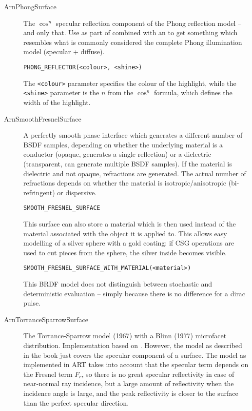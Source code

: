 \begin{description}
\item[ArnPhongSurface] The $\cos^n$ specular reflection component of the Phong reflection model -- and only that. Use as
  part of  combined with an
   to get something which resembles what is commonly considered the complete Phong illumination model (\ie specular + diffuse).
\begin{verbatim}
PHONG_REFLECTOR(<colour>, <shine>)
\end{verbatim}
The \texttt{<colour>} parameter specifies the colour of the highlight, while the \texttt{<shine>} parameter is the $n$ from the $\cos^n$ formula, which defines the width of the highlight.
\item[ArnSmoothFresnelSurface] A perfectly smooth phase interface which generates a different number of BSDF samples, depending on whether the underlying material is a conductor (opaque, generates a single reflection) or a dielectric (transparent, can generate multiple BSDF samples). If the material is dielectric and not opaque, refractions are generated. The actual number of refractions depends on whether the material is isotropic/anisotropic (\ie bi-refringent) or dispersive.
\begin{verbatim}
SMOOTH_FRESNEL_SURFACE
\end{verbatim}
This surface can also store a material which is then used instead of the material associated with the object it is applied to. This allows easy modelling of \eg a silver sphere with a gold coating: if CSG operations are used to cut pieces from the sphere, the silver inside becomes visible.
\begin{verbatim}
SMOOTH_FRESNEL_SURFACE_WITH_MATERIAL(<material>)
\end{verbatim}
This BRDF model does not distinguish between stochastic and deterministic evaluation -- simply because there is no difference for a dirac pulse. 
\item[ArnTorranceSparrowSurface] The Torrance-Sparrow model (1967) with
  a Blinn (1977) microfacet distribution. Implementation based on
  \cite{975275}. However, the model as described in the book just covers the specular
  component of a surface. The model as implemented in ART takes into account that the specular
  term depends on the Fresnel term $F_r$, so there is no great
  specular reflectivity in case of near-normal ray incidence, but a
  large amount of reflectivity when the incidence angle is large, and
  the peak reflectivity is closer to the surface than the perfect
  specular direction.


\end{description}

